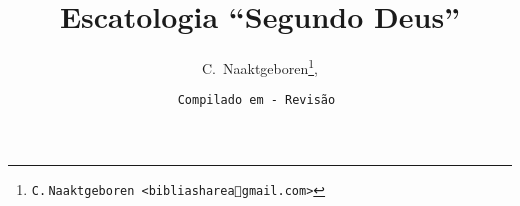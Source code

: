 \newcommand{\XXX}[1]{\relax}
\newcommand{\YA}{%
    \mbox{%
        Y\makebox[0pt][l]{\hspace{-0.178em}\raisebox{-0.00ex}{\scalebox{0.30}{E}}}%
        H\makebox[0pt][l]{\hspace{-0.010em}\raisebox{-0.00ex}{\scalebox{0.30}{O}}}%
        W\makebox[0pt][l]{\hspace{-0.245em}\raisebox{-0.00ex}{\scalebox{0.30}{A}}}%
        H%
    }%
}
\newcommand{\bQuote}[1]{``\textrm{\addfontfeature{ScriptureColor}{#1}}''}
\newcommand{\bLineQuote}[3]{\bQuote{{#1}} {#2} ({#3})~\cite{{#3}}}
\newcommand{\bBlockQuoteAft}[3]{%
    \begin{adjustwidth}{0.1\linewidth}{0.1\linewidth}
        \parindent 0pt
        \bQuote{{#1}} ---~{#2} ({#3})~\cite{{#3}}
    \end{adjustwidth}
    \vspace*{0.25\baselineskip}
}
\newcommand{\bBlockQuote}[3]{%
    \vspace*{0.25\baselineskip}%
    \bBlockQuoteAft{{#1}}{{#2}}{{#3}}%
}
\newtheorem{DEF}{Definição}

\makeatletter
\immediate{}
\immediate{}
\makeatother
\title{\textbf{Escatologia ``Segundo Deus''}}
\author{C.~Naaktgeboren\thanks{\texttt{C.$\,$Naaktgeboren <bibliashare\textcircled{a}gmail.com>}},}
\date{{\scriptsize\texttt{Compilado em  - Revisão }}}
